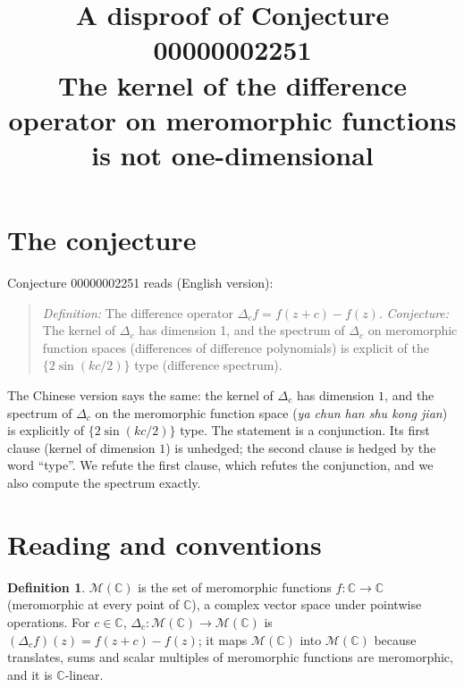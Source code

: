 \documentclass[11pt]{article}
\title{A disproof of Conjecture 00000002251\\[2pt]
\large The kernel of the difference operator on meromorphic functions is not one-dimensional}
\date{}
\theoremstyle{definition}
\newtheorem{definition}[theorem]{Definition}
\theoremstyle{remark}
\renewcommand{\_}{\oldus\allowbreak}
\newcommand{\M}{\mathcal{M}(\mathbb{C})}
\begin{document}
\sloppy
\maketitle

\section{The conjecture}

Conjecture 00000002251 reads (English version):

\begin{quote}
\emph{Definition:} The difference operator $\Delta_c f = f(z+c) - f(z)$.
\emph{Conjecture:} The kernel of $\Delta_c$ has dimension 1, and the spectrum of $\Delta_c$ on
meromorphic function spaces (differences of difference polynomials) is explicit of the
$\{2\sin(kc/2)\}$ type (difference spectrum).
\end{quote}

The Chinese version says the same: the kernel of $\Delta_c$ has dimension $1$, and the spectrum of
$\Delta_c$ on the meromorphic function space (\emph{ya chun han shu kong jian}) is explicitly of
$\{2\sin(kc/2)\}$ type. The statement is a conjunction. Its first clause (kernel of dimension $1$) is
unhedged; the second clause is hedged by the word ``type''. We refute the first clause, which refutes the
conjunction, and we also compute the spectrum exactly.

\section{Reading and conventions}

\begin{definition}
$\M$ is the set of meromorphic functions $f:\mathbb{C}\to\mathbb{C}$ (meromorphic at every point of
$\mathbb{C}$), a complex vector space under pointwise operations. For $c\in\mathbb{C}$,
$\Delta_c:\M\to\M$ is $(\Delta_c f)(z) = f(z+c)-f(z)$; it maps $\M$ into $\M$ because translates, sums and
scalar multiples of meromorphic functions are meromorphic, and it is $\mathbb{C}$-linear.
\end{definition}
\end{document}
